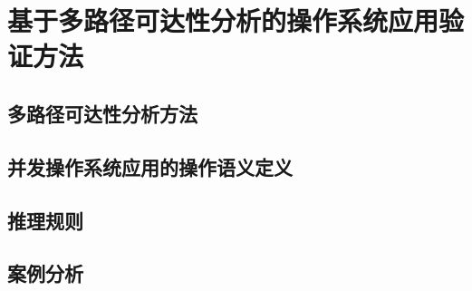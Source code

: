 \chapter{基于多路径可达性分析的操作系统应用验证方法}
\section{多路径可达性分析方法}
\section{并发操作系统应用的操作语义定义}
\section{推理规则}
\section{案例分析}

